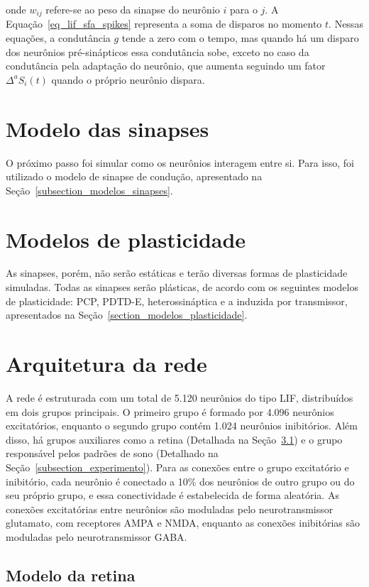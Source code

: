 \noindent{}onde $w_{ij}$ refere-se ao peso da sinapse do neurônio $i$ para o $j$. A Equação~\ref{eq_lif_sfa_spikes} representa a
soma de disparos no momento $t$. Nessas equações, a condutância $g$ tende a zero com o tempo, mas quando há um disparo dos
neurônios pré-sinápticos essa condutância sobe, exceto no caso da condutância pela adaptação do neurônio, que aumenta seguindo um
fator $\Delta^{a}S_i(t)$ quando o próprio neurônio dispara.


\section{Modelo das sinapses}

O próximo passo foi simular como os neurônios interagem entre si. Para isso, foi utilizado o modelo de sinapse de condução,
apresentado na Seção~\ref{subsection_modelos_sinapses}.

\section{Modelos de plasticidade}

As sinapses, porém, não serão estáticas e terão diversas formas de plasticidade simuladas. Todas as sinapses serão plásticas, de
acordo com os seguintes modelos de plasticidade: PCP, PDTD-E, heterossináptica e a induzida por transmissor, apresentados na
Seção~\ref{section_modelos_plasticidade}.

\section{Arquitetura da rede}

A rede é estruturada com um total de 5.120 neurônios do tipo LIF, distribuídos em dois grupos principais. O primeiro grupo é
formado por 4.096 neurônios excitatórios, enquanto o segundo grupo contém 1.024 neurônios inibitórios. Além disso, há grupos
auxiliares como a retina (Detalhada na Seção~\ref{subsection_retina}) e o grupo responsável pelos padrões de sono (Detalhado na
Seção~\ref{subsection_experimento}). Para as conexões entre o grupo excitatório e inibitório, cada neurônio é conectado a 10\% dos
neurônios de outro grupo ou do seu próprio grupo, e essa conectividade é estabelecida de forma aleatória. As conexões excitatórias
entre neurônios são moduladas pelo neurotransmissor glutamato, com receptores AMPA e NMDA, enquanto as conexões inibitórias são
moduladas pelo neurotransmissor GABA.

\subsection{Modelo da retina}\label{subsection_retina}

